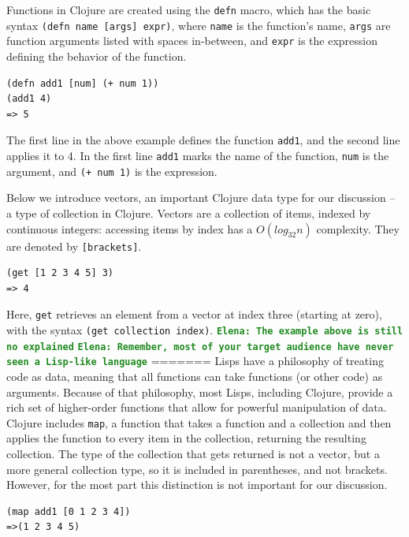 \documentclass[12pt]{article}
\newcommand{\comment}[1]{{\bf \tt  {#1}}}
\newcommand{\emcomment}[1]{\textcolor{ForestGreen}{\comment{Elena: {#1}}}}
\newcommand{\clocode}[1]{{\texttt {#1}}}
\begin{document}
Functions in Clojure are created using the \clocode{defn} macro, which has the basic syntax \clocode{(defn name [args] expr)}, where \clocode{name} is the function's name, \clocode{args} are function arguments listed with spaces in-between, and \clocode{expr} is the expression defining the behavior of the function. 
\begin{verbatim}
(defn add1 [num] (+ num 1))
(add1 4)
=> 5
\end{verbatim} 
The first line in the above example defines the function \clocode{add1}, and the second line applies it to 4. In the first line \clocode{add1} marks the name of the function, \clocode{num} is the argument, and \clocode{(+ num 1)} is the expression.

Below we introduce vectors, an important Clojure data type for our discussion -- a type of collection in Clojure. Vectors are a collection of items, indexed by continuous integers: accessing items by index has a $O(log_{32}n)$  complexity. They are denoted by 
\clocode{[brackets]}.
\begin{verbatim}
(get [1 2 3 4 5] 3)
=> 4
\end{verbatim}
Here, \clocode{get} retrieves an element from a vector at index three (starting at zero), with the syntax \clocode{(get collection index)}.
\emcomment{The example above is still no explained}
\emcomment{Remember, most of your target audience have never seen a Lisp-like language}
=======
Lisps have a philosophy of treating code as data, meaning that all functions can take functions (or other code) as arguments. Because of that philosophy, most Lisps, including Clojure, provide a rich set of higher-order functions that allow for powerful manipulation of data. Clojure includes \clocode{map}, a function that takes a function and a collection and then applies the function to every item in the collection, returning the resulting collection. The type of the collection that gets returned is not a vector, but a more general collection type, so it is included in parentheses, and not brackets. However, for the most part this distinction is not important for our discussion. 
\begin{verbatim}
(map add1 [0 1 2 3 4])
=>(1 2 3 4 5)
\end{verbatim}
\end{document}
